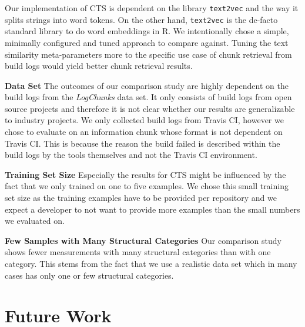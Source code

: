 Our implementation of CTS is dependent on the library {\tt text2vec}
and the way it splits strings into word tokens. On the other hand,
{\tt text2vec} is the de-facto standard library to do word embeddings
in R. We intentionally chose a simple, minimally configured and tuned
approach to compare against. Tuning the text similarity
meta-parameters more to the specific use case of chunk retrieval from
build logs would yield better chunk retrieval results.

\noindent
\textbf{Data Set}
The outcomes of our comparison study are highly dependent on the build
logs from the \emph{LogChunks} data set. It only consists of build
logs from open source projects and therefore it is not clear whether
our results are generalizable to industry projects. We only collected
build logs from Travis CI, however we chose to evaluate on an
information chunk whose format is not dependent on Travis CI\@. This
is because the reason the build failed is described within the build
logs by the tools themselves and not the Travis CI environment.

\noindent
\textbf{Training Set Size}
Especially the results for CTS might be influenced by the fact that we
only trained on one to five examples. We chose this small training set
size as the training examples have to be provided per repository and
we expect a developer to not want to provide more examples than the
small numbers we evaluated on.

\noindent
\textbf{Few Samples with Many Structural Categories}
Our comparison study shows fewer measurements with many structural
categories than with one category.
This stems from the fact that we use a realistic data set which in
many cases has only one or few structural categories.

\section{Future Work}

